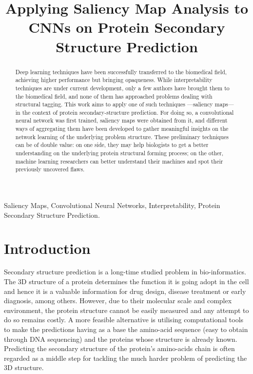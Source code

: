 \documentclass{article}
\title{Applying Saliency Map Analysis to CNNs on Protein Secondary Structure	Prediction}
\begin{document}
%
\maketitle
%
\begin{abstract}

Deep learning techniques have been successfully transferred to the biomedical field, achieving higher performance but bringing opaqueness. While interpretability techniques are under current development, only a few authors have brought them to the biomedical field, and none of them has approached problems dealing with structural tagging. This work aims to apply one of such techniques ---saliency maps--- in the context of protein secondary-structure prediction. For doing so, a convolutional neural network was first trained, saliency maps were obtained from it, and different ways of aggregating them have been developed to gather meaningful insights on the network learning of the underlying problem structure. These preliminary techniques can be of double value: on one side, they may help biologists to get a better understanding on the underlying protein structural forming process; on the other, machine learning researchers can better understand their machines and spot their previously uncovered flaws.
\end{abstract}
%
\begin{keywords}
Saliency Maps, Convolutional Neural Networks, Interpretability, Protein Secondary Structure Prediction.
\end{keywords}
%
\section{Introduction}
\label{sec:intro}



Secondary structure prediction is a long-time studied problem in bio-informatics. The 3D structure of a protein determines the function it is going adopt in the cell and hence it is a valuable information for drug design, disease treatment or early diagnosis, among others. However, due to their molecular scale and complex environment, the protein structure cannot be easily measured and any attempt to do so remains costly. A more feasible alternative is utilising computational tools to make the predictions having as a base the amino-acid sequence (easy to obtain through DNA sequencing) and the proteins whose structure is already known. Predicting the secondary structure of the protein's amino-acids chain is often regarded as a middle step for tackling the much harder problem of predicting the 3D structure.
\end{document}

